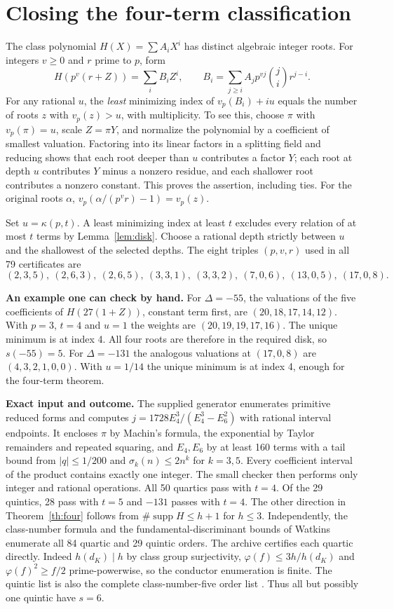 \documentclass[11pt,letterpaper]{article}
\newcommand{\supp}{\operatorname{supp}}\newcommand{\ord}{\operatorname{ord}}
\newcommand{\heading}[1]{\textbf{\color{ink}#1}}
\begin{document}
\section{Closing the four-term classification}\label{sec:cert}
The class polynomial $H(X)=\sum A_iX^i$ has distinct algebraic integer roots. For integers $v\ge0$ and $r$ prime to $p$, form
\[
 H(p^v(r+Z))=\sum_i B_i Z^i,\qquad
 B_i=\sum_{j\ge i} A_jp^{vj}\binom ji r^{j-i}.
\]
For any rational $u$, the \emph{least} minimizing index of $v_p(B_i)+iu$ equals the number of roots $z$ with $v_p(z)>u$, with multiplicity. To see this, choose $\pi$ with $v_p(\pi)=u$, scale $Z=\pi Y$, and normalize the polynomial by a coefficient of smallest valuation. Factoring into its linear factors in a splitting field and reducing shows that each root deeper than $u$ contributes a factor $Y$; each root at depth $u$ contributes $Y$ minus a nonzero residue, and each shallower root contributes a nonzero constant. This proves the assertion, including ties. For the original roots $\alpha$, $v_p(\alpha/(p^vr)-1)=v_p(z)$.

Set $u=\kappa(p,t)$. A least minimizing index at least $t$ excludes every relation of at most $t$ terms by Lemma~\ref{lem:disk}. Choose a rational depth strictly between $u$ and the shallowest of the selected depths. The eight triples $(p,v,r)$ used in all 79 certificates are
\[
 (2,3,5),\ (2,6,3),\ (2,6,5),\ (3,3,1),\ (3,3,2),\ (7,0,6),\ (13,0,5),\ (17,0,8).
\]

\heading{An example one can check by hand.} For $\Delta=-55$, the valuations of the five coefficients of $H(27(1+Z))$, constant term first, are $(20,18,17,14,12)$. With $p=3$, $t=4$ and $u=1$ the weights are $(20,19,19,17,16)$. The unique minimum is at index 4. All four roots are therefore in the required disk, so $s(-55)=5$. For $\Delta=-131$ the analogous valuations at $(17,0,8)$ are $(4,3,2,1,0,0)$. With $u=1/14$ the unique minimum is at index 4, enough for the four-term theorem.

\heading{Exact input and outcome.} The supplied generator enumerates primitive reduced forms and computes $j=1728E_4^3/(E_4^3-E_6^2)$ with rational interval endpoints. It encloses $\pi$ by Machin's formula, the exponential by Taylor remainders and repeated squaring, and $E_4,E_6$ by at least 160 terms with a tail bound from $|q|\le1/200$ and $\sigma_k(n)\le2n^k$ for $k=3,5$. Every coefficient interval of the product contains exactly one integer. The small checker then performs only integer and rational operations. All 50 quartics pass with $t=4$. Of the 29 quintics, 28 pass with $t=5$ and $-131$ passes with $t=4$. The other direction in Theorem~\ref{th:four} follows from $\#\supp H\le h+1$ for $h\le3$. Independently, the class-number formula and the fundamental-discriminant bounds of Watkins \cite{watkins} enumerate all 84 quartic and 29 quintic orders. The archive certifies each quartic directly. Indeed $h(d_K)\mid h$ by class group surjectivity, $\varphi(f)\le3h/h(d_K)$ and $\varphi(f)^2\ge f/2$ prime-powerwise, so the conductor enumeration is finite. The quintic list is also the complete class-number-five order list \cite{orders}. Thus all but possibly one quintic have $s=6$.
\end{document}
